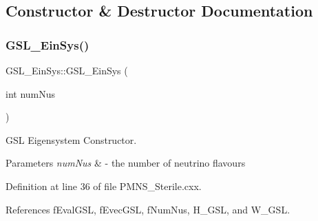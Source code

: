 \subsection{Constructor \& Destructor Documentation}
\mbox{\label{structOscProb_1_1GSL__EinSys_af6a40b1ed40d5d9b36a7a7bdf8aedc99}} 
\subsubsection{\texorpdfstring{G\+S\+L\+\_\+\+Ein\+Sys()}{GSL\_EinSys()}\hspace{0.1cm}{\footnotesize\ttfamily [1/2]}}
{\footnotesize\ttfamily G\+S\+L\+\_\+\+Ein\+Sys\+::\+G\+S\+L\+\_\+\+Ein\+Sys (\begin{DoxyParamCaption}\item[{int}]{num\+Nus }\end{DoxyParamCaption})}

G\+SL Eigensystem Constructor.


\begin{DoxyParams}{Parameters}
{\em num\+Nus} & -\/ the number of neutrino flavours \\
\hline
\end{DoxyParams}


Definition at line 36 of file P\+M\+N\+S\+\_\+\+Sterile.\+cxx.



References f\+Eval\+G\+SL, f\+Evec\+G\+SL, f\+Num\+Nus, H\+\_\+\+G\+SL, and W\+\_\+\+G\+SL.


